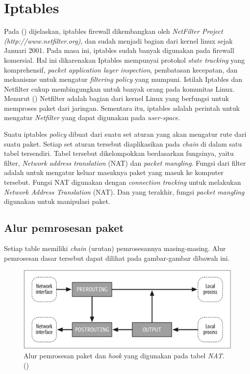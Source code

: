 \section{Iptables}
Pada (\cite{rash2007linux}) dijelaskan, iptables firewall dikembangkan oleh \textit{NetFilter Project} \textit{(http://www.netfilter.org)}, dan sudah menjadi bagian dari kernel linux sejak Januari 2001.  Pada masa ini, iptables sudah banyak digunakan pada firewall komersial. Hal ini dikarenakan Iptables mempunyai protokol \textit{state tracking} yang komprehensif, \textit{packet application layer inspection}, pembatasan kecepatan, dan mekanisme untuk mengatur \textit{filtering policy} yang mumpuni. 
Istilah Iptables dan Netfilter cukup membingungkan untuk banyak orang pada komunitas Linux. Menurut (\cite{purdy2004linux}) Netfilter adalah bagian dari kernel Linux yang berfungsi untuk memproses paket dari jaringan. Sementara itu,  iptables adalah perintah untuk mengatur \textit{Netfilter} yang dapat digunakan pada \textit{user-space}. 

Suatu iptables \textit{policy} dibuat dari suatu set aturan yang akan mengatur rute dari suatu paket. Setiap set aturan tersebut diaplikasikan pada \textit{chain} di dalam satu tabel tersendiri. Tabel tersebut dikelompokkan berdasarkan fungsinya, yaitu filter, \textit{Network address translation} (NAT) dan \textit{packet mangling}. Fungsi dari filter adalah untuk mengatur keluar masuknya paket yang masuk ke komputer tersebut. Fungsi NAT digunakan dengan \textit{connection tracking} untuk melakukan \textit{Network Address Translation} (NAT). Dan yang terakhir, fungsi \textit{packet mangling} digunakan untuk manipulasi paket.

\subsection{Alur pemrosesan paket}
Setiap table memiliki \textit{chain} (urutan) pemrosesannya masing-masing. Alur pemrosesan dasar tersebut dapat dilihat pada gambar-gambar dibawah ini.
\begin{figure}[H]
	\centering
	\includegraphics[width=\textwidth]{resources/nat_table.png}
	\caption{Alur pemrosesan paket dan \textit{hook} yang digunakan pada tabel \textit{NAT}. (\cite{purdy2004linux})}
	\label{fig:packetflow_NAT}
\end{figure}

